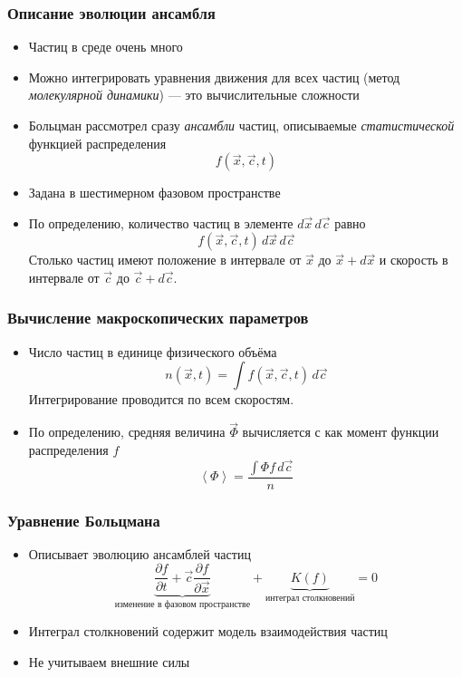 \documentclass[onlymath]{beamer}
\newcommand\avg[1]{\left\langle{#1}\right\rangle}
\newcommand{\pardiff}[2]{\frac{\partial{#1}}{\partial{#2}}}
\begin{document}
\begin{frame}
  \frametitle{Описание эволюции ансамбля}
  \begin{itemize}
  \item Частиц в среде очень много
  \item Можно интегрировать уравнения движения для всех частиц (метод
    \emph{молекулярной динамики}) — это вычислительные сложности
  \item Больцман рассмотрел сразу \emph{ансамбли} частиц, описываемые
    \emph{статистической} функцией распределения
    \begin{equation*}
      f(\vec{x}, \vec{c}, t)
    \end{equation*}
  \item Задана в шестимерном фазовом пространстве
  \item По определению, количество частиц в элементе $d\vec{x}\,
    d\vec{c}$ равно
    \begin{equation*}
      f(\vec{x}, \vec{c}, t) \,d\vec{x}\, d\vec{c}
    \end{equation*}
    Столько частиц имеют положение в интервале от $\vec{x}$ до
    $\vec{x}+d\vec{x}$ и скорость в интервале от $\vec{c}$ до
    $\vec{c}+d\vec{c}$.
  \end{itemize}
\end{frame}

\begin{frame}
  \frametitle{Вычисление макроскопических параметров}
  \begin{itemize}
  \item Число частиц в единице физического объёма
    \begin{equation*}
      n(\vec{x}, t) = \int f(\vec{x}, \vec{c}, t)\,d\vec{c}
    \end{equation*}
    Интегрирование проводится по всем скоростям.
  \item По определению, средняя величина $\vec{\Phi}$ вычисляется с
    как момент функции распределения $f$
    \begin{equation*}
      \avg{\Phi} = \frac{\int{\Phi f \,d\vec{c}}}{n}
    \end{equation*}
  \end{itemize}
\end{frame}

\begin{frame}
  \frametitle{Уравнение Больцмана}
  \begin{itemize}
  \item Описывает эволюцию ансамблей частиц
    \begin{equation*}
      \underbrace{\pardiff{f}{t} +
        \vec{c} \pardiff{f}{\vec{x}}}_{\text{изменение в фазовом
          пространстве}} + 
      \underbrace{K(f)}_{\text{интеграл столкновений}} = 0
    \end{equation*}
  \item Интеграл столкновений содержит модель взаимодействия частиц
  \item Не учитываем внешние силы
  \end{itemize}
\end{frame}
\end{document}
